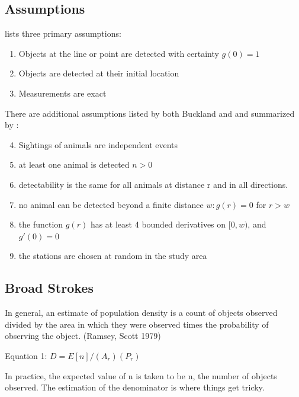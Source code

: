 \documentclass[12pt]{article}
\begin{document}
\subsection{Assumptions}
\textcite{buckland2001} lists three primary assumptions:
\begin{enumerate}
	\item Objects at the line or point are detected with certainty $g(0)=1$
	\item Objects are detected at their initial location
	\item Measurements are exact
\end{enumerate}

There are additional assumptions listed by both Buckland and \textcite{ramsey1979} and summarized by \textcite{quang1993}:
\begin{enumerate}
	\setcounter{enumi}{3}
	\item Sightings of animals are independent events
	\item at least one animal is detected $n > 0$
	\item detectability is the same for all animals at distance r and in all directions.
	\item no animal can be detected beyond a finite distance $w: g(r) = 0$ for $r > w$
	\item the function $g(r)$ has at least 4 bounded derivatives on $[0, w)$, and $g'(0)=0$
	\item the stations are chosen at random in the study area
\end{enumerate}



\subsection{Broad Strokes}
In general, an estimate of population density is a count of objects observed divided by the area in which they were observed times the probability of observing the object. (Ramsey, Scott 1979)

Equation 1: $D = E[n]/(A_r)(P_r)$

In practice, the expected value of n is taken to be n, the number of objects observed. The estimation of the denominator is where things get tricky.
\end{document}
